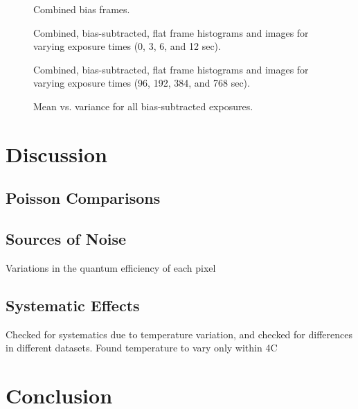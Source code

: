 \documentclass[onecolumn]{aastex62}
\begin{document}
\begin{figure}[ht]
\caption{Combined bias frames.} \label{fig:bias}
\end{figure}
\begin{figure}[ht]
\caption{Combined, bias-subtracted, flat frame histograms and images for varying exposure times (0, 3, 6, and 12 sec). \label{fig:flats1}}
\end{figure}
\begin{figure}[ht]
\caption{Combined, bias-subtracted, flat frame histograms and images for varying exposure times (96, 192, 384, and 768 sec). \label{fig:flats2}}
\end{figure}

\begin{figure}[ht]
\caption{Mean vs. variance for all bias-subtracted exposures.} \label{fig:mean_var}
\end{figure}

\section{Discussion}
\subsection{Poisson Comparisons}

\subsection{Sources of Noise}
Variations in the quantum efficiency of each pixel

\subsection{Systematic Effects}
Checked for systematics due to temperature variation, and checked for differences in different datasets. Found temperature to vary only within 4C

\section{Conclusion}
\end{document}
